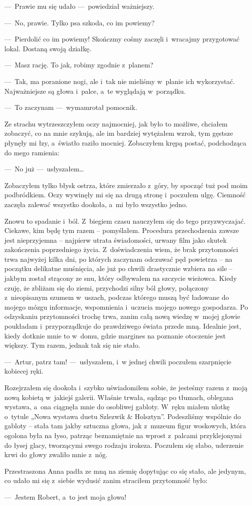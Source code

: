---~Prawie mu się udało ---~powiedział ważniejszy.

---~No, prawie. Tylko psa szkoda, co im powiemy?

---~Pierdolić co im powiemy! Skończmy cośmy zaczęli i~wracajmy przygotować lokal. Dostaną swoją działkę.

---~Masz rację. To jak, robimy zgodnie z~planem? 

---~Tak, ma poranione nogi, ale i~tak nie mieliśmy w~planie ich wykorzystać. Najważniejsze są głowa i~palce, a~te wyglądają w~porządku.

---~To zaczynam ---~wymamrotał pomocnik.

Ze strachu wytrzeszczyłem oczy najmocniej, jak było to możliwe, chciałem zobaczyć, co na mnie szykują, ale im bardziej wytężałem wzrok, tym gęstsze płynęły mi łzy, a~światło raziło mocniej. Zobaczyłem krępą postać, podchodząca do mego ramienia:

---~No już ---~usłyszałem…

Zobaczyłem tylko błysk ostrza, które zmierzało z~góry, by spocząć tuż pod moim podbródkiem. Oczy wywinęły mi się na drugą stronę i~poczułem ulgę. Ciemność zaczęła zalewać wszystko dookoła, a~mi było wszystko jedno. 

\paraSep

Znowu to spadanie i~ból. Z~biegiem czasu nauczyłem się do tego przyzwyczajać. Ciekawe, kim będę tym razem -- pomyślałem. Procedura przechodzenia zawsze jest nieprzyjemna -- najpierw utrata świadomości, urwany film jako skutek zakończenia poprzedniego życia. Z~doświadczenia wiem, że brak przytomności trwa najwyżej kilka dni, po których zaczynam odczuwać pęd powietrza -- na początku delikatne muśnięcia, ale już po chwili drastycznie wzbiera na sile -- jakbym został strącony ze snu, który odbywałem na szczycie wieżowca. Kiedy czuję, że zbliżam się do ziemi, przychodzi silny ból głowy, połączony z~nieopisanym szumem w~uszach, podczas którego muszą być ładowane do mojego mózgu informacje, wspomnienia i~uczucia mojego nowego gospodarza. Po odzyskaniu przytomności trochę trwa, zanim całą nową wiedzę w~mojej głowie poukładam i~przyporządkuje do prawdziwego świata przede mną. Idealnie jest, kiedy dotknie mnie to w~domu, gdzie margines na poznanie otoczenie jest większy. Tym razem, jednak tak się nie stało.

---~Artur, patrz tam! ---~usłyszałem, i~w jednej chwili poczułem szarpnięcie kobiecej ręki.
 
Rozejrzałem się dookoła i~szybko uświadomiłem sobie, że jesteśmy razem z~moją nową kobietą w~jakiejś galerii. Właśnie trwała, sądząc po tłumach, oblegana wystawa, a~ona ciągnęła mnie do osobliwej gabloty. W~ręku miałem ulotkę o~tytule „Nowa wystawa duetu Szlezwik \& Holsztyn”. Podeszliśmy wspólnie do gabloty -- stała tam jakby sztuczna głowa, jak z~muzeum figur woskowych, która ogolona była na łyso, patrząc beznamiętnie na wprost z~palcami przyklejonymi do łysej glacy, tworzącymi swego rodzaju irokeza. Poczułem się słabo, uderzenie krwi do głowy zwaliło mnie z~nóg. 

Przestraszona Anna padła ze mną na ziemię dopytując co się stało, ale jedynym, co udało mi się z~siebie wydusić zanim straciłem przytomność było: 

---~Jestem Robert, a~to jest moja głowa!
